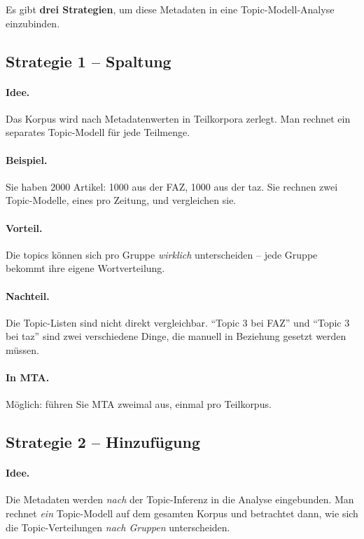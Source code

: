 \documentclass[a4paper,11pt]{article}
\begin{document}
Es gibt \textbf{drei Strategien}, um diese Metadaten in eine
Topic-Modell-Analyse einzubinden.

\subsection{Strategie 1 -- Spaltung}

\paragraph{Idee.} Das Korpus wird nach Metadatenwerten in Teilkorpora
zerlegt. Man rechnet ein separates Topic-Modell für jede Teilmenge.

\paragraph{Beispiel.} Sie haben 2000 Artikel: 1000 aus der FAZ, 1000
aus der taz. Sie rechnen zwei Topic-Modelle, eines pro Zeitung, und
vergleichen sie.

\paragraph{Vorteil.} Die topics können sich pro Gruppe \emph{wirklich}
unterscheiden -- jede Gruppe bekommt ihre eigene Wortverteilung.

\paragraph{Nachteil.} Die Topic-Listen sind nicht direkt vergleichbar.
\enquote{Topic 3 bei FAZ} und \enquote{Topic 3 bei taz} sind zwei
verschiedene Dinge, die manuell in Beziehung gesetzt werden müssen.

\paragraph{In MTA.} Möglich: führen Sie MTA zweimal aus, einmal pro
Teilkorpus.

\subsection{Strategie 2 -- Hinzufügung}

\paragraph{Idee.} Die Metadaten werden \emph{nach} der Topic-Inferenz
in die Analyse eingebunden. Man rechnet \emph{ein} Topic-Modell auf
dem gesamten Korpus und betrachtet dann, wie sich die
Topic-Verteilungen \emph{nach Gruppen} unterscheiden.
\end{document}
